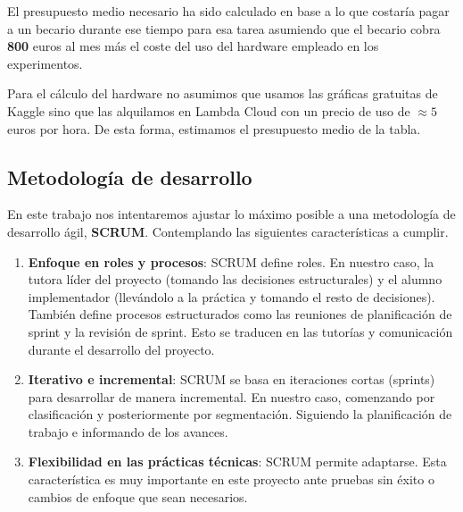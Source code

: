 El presupuesto medio necesario ha sido calculado en base a lo que costaría pagar a un becario durante ese tiempo para esa tarea asumiendo que el becario cobra \textbf{800} euros al mes más el coste del uso del hardware empleado en los experimentos. 

Para el cálculo del hardware no asumimos que usamos las gráficas gratuitas de Kaggle sino que las alquilamos en Lambda Cloud con un precio de uso de $\approx 5$ euros por hora. De esta forma, estimamos el presupuesto medio de la tabla.


\subsection{Metodología de desarrollo}

En este trabajo nos intentaremos ajustar lo máximo posible a una metodología de desarrollo ágil, \textbf{SCRUM}. Contemplando las siguientes características a cumplir.

\begin{enumerate}
	\item \textbf{Enfoque en roles y procesos}: SCRUM define roles. En nuestro caso, la tutora líder del proyecto (tomando las decisiones estructurales) y el alumno implementador (llevándolo a la práctica y tomando el resto de decisiones). También define procesos estructurados como las reuniones de planificación de sprint y la revisión de sprint. Esto se traducen en las tutorías y comunicación durante el desarrollo del proyecto.
	
	\item \textbf{Iterativo e incremental}: SCRUM se basa en iteraciones cortas (sprints) para desarrollar de manera incremental. En nuestro caso, comenzando por clasificación y posteriormente por segmentación. Siguiendo la planificación de trabajo e informando de los avances.
	
	\item \textbf{Flexibilidad en las prácticas técnicas}: SCRUM permite adaptarse. Esta característica es muy importante en este proyecto ante pruebas sin éxito o cambios de enfoque que sean necesarios.
\end{enumerate}